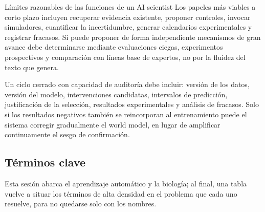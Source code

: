 
\begin{knowledgebox}{Límites razonables de las funciones de un AI scientist}
Los papeles más viables a corto plazo incluyen recuperar evidencia existente, proponer controles, invocar simuladores, cuantificar la incertidumbre, generar calendarios experimentales y registrar fracasos. Si puede proponer de forma independiente mecanismos de gran avance debe determinarse mediante evaluaciones ciegas, experimentos prospectivos y comparación con líneas base de expertos, no por la fluidez del texto que genera.
\end{knowledgebox}

Un ciclo cerrado con capacidad de auditoría debe incluir: versión de los datos, versión del modelo, intervenciones candidatas, intervalos de predicción, justificación de la selección, resultados experimentales y análisis de fracasos. Solo si los resultados negativos también se reincorporan al entrenamiento puede el sistema corregir gradualmente el world model, en lugar de amplificar continuamente el sesgo de confirmación.

\subsection{Términos clave}

Esta sesión abarca el aprendizaje automático y la biología; al final, una tabla vuelve a situar los términos de alta densidad en el problema que cada uno resuelve, para no quedarse solo con los nombres.

